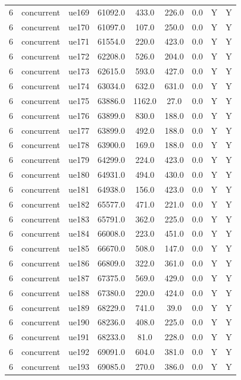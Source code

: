 \begin{table}[ht]
\begin{tabular}{|c|c|c|c|c|c|c|c|c|}
6 & concurrent & ue169 & 61092.0 & 433.0 & 226.0 & 0.0 & Y & Y \\
6 & concurrent & ue170 & 61097.0 & 107.0 & 250.0 & 0.0 & Y & Y \\
6 & concurrent & ue171 & 61554.0 & 220.0 & 423.0 & 0.0 & Y & Y \\
6 & concurrent & ue172 & 62208.0 & 526.0 & 204.0 & 0.0 & Y & Y \\
6 & concurrent & ue173 & 62615.0 & 593.0 & 427.0 & 0.0 & Y & Y \\
6 & concurrent & ue174 & 63034.0 & 632.0 & 631.0 & 0.0 & Y & Y \\
6 & concurrent & ue175 & 63886.0 & 1162.0 & 27.0 & 0.0 & Y & Y \\
6 & concurrent & ue176 & 63899.0 & 830.0 & 188.0 & 0.0 & Y & Y \\
6 & concurrent & ue177 & 63899.0 & 492.0 & 188.0 & 0.0 & Y & Y \\
6 & concurrent & ue178 & 63900.0 & 169.0 & 188.0 & 0.0 & Y & Y \\
6 & concurrent & ue179 & 64299.0 & 224.0 & 423.0 & 0.0 & Y & Y \\
6 & concurrent & ue180 & 64931.0 & 494.0 & 430.0 & 0.0 & Y & Y \\
6 & concurrent & ue181 & 64938.0 & 156.0 & 423.0 & 0.0 & Y & Y \\
6 & concurrent & ue182 & 65577.0 & 471.0 & 221.0 & 0.0 & Y & Y \\
6 & concurrent & ue183 & 65791.0 & 362.0 & 225.0 & 0.0 & Y & Y \\
6 & concurrent & ue184 & 66008.0 & 223.0 & 451.0 & 0.0 & Y & Y \\
6 & concurrent & ue185 & 66670.0 & 508.0 & 147.0 & 0.0 & Y & Y \\
6 & concurrent & ue186 & 66809.0 & 322.0 & 361.0 & 0.0 & Y & Y \\
6 & concurrent & ue187 & 67375.0 & 569.0 & 429.0 & 0.0 & Y & Y \\
6 & concurrent & ue188 & 67380.0 & 220.0 & 424.0 & 0.0 & Y & Y \\
6 & concurrent & ue189 & 68229.0 & 741.0 & 39.0 & 0.0 & Y & Y \\
6 & concurrent & ue190 & 68236.0 & 408.0 & 225.0 & 0.0 & Y & Y \\
6 & concurrent & ue191 & 68233.0 & 81.0 & 228.0 & 0.0 & Y & Y \\
6 & concurrent & ue192 & 69091.0 & 604.0 & 381.0 & 0.0 & Y & Y \\
6 & concurrent & ue193 & 69085.0 & 270.0 & 386.0 & 0.0 & Y & Y \\

\end{tabular}
\end{table}
